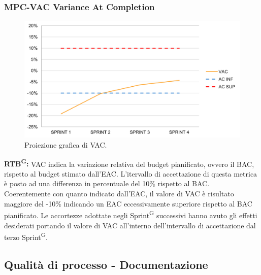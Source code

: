 \documentclass[8pt]{article}
\newcommand{\glossterm}[1]{#1\textsuperscript{G}} %
\begin{document}
\subsubsection{MPC-VAC Variance At Completion}
\begin{figure}[h!]
    \centering
    \includegraphics[width=1\textwidth]{images/VAC.png}
    \caption{Proiezione grafica di VAC.}
    \label{fig:Proiezione grafica di VAC}
\end{figure}
\textbf{\glossterm{RTB}:} VAC indica la variazione relativa del budget pianificato, ovvero il BAC, rispetto al budget stimato dall'EAC. L'itervallo di accettazione di questa metrica è posto ad una differenza in percentuale del 10\% rispetto al BAC.\\
Coerentemente con quanto indicato dall'EAC, il valore di VAC è risultato maggiore del -10\% indicando un EAC eccessivamente superiore rispetto al BAC pianificato. Le accortezze adottate negli \glossterm{Sprint} successivi hanno avuto gli effetti desiderati portando il valore di VAC all'interno dell'intervallo di accettazione dal terzo \glossterm{Sprint}.
\clearpage
\subsection{Qualità di processo - Documentazione}
\end{document}
